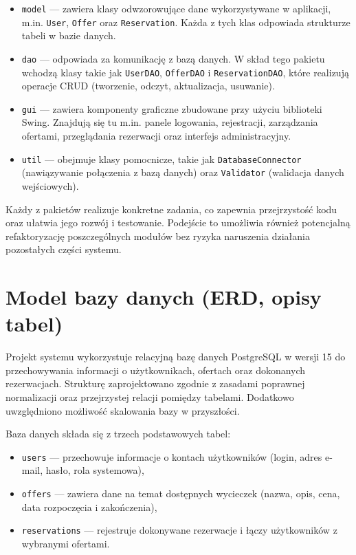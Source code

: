 \begin{itemize}
    \item \texttt{model} — zawiera klasy odwzorowujące dane wykorzystywane w aplikacji, m.in. \texttt{User}, \texttt{Offer} oraz \texttt{Reservation}. Każda z tych klas odpowiada strukturze tabeli w bazie danych.
    
    \item \texttt{dao} — odpowiada za komunikację z bazą danych. W skład tego pakietu wchodzą klasy takie jak \texttt{UserDAO}, \texttt{OfferDAO} i \texttt{ReservationDAO}, które realizują operacje CRUD (tworzenie, odczyt, aktualizacja, usuwanie).
    
    \item \texttt{gui} — zawiera komponenty graficzne zbudowane przy użyciu biblioteki Swing. Znajdują się tu m.in. panele logowania, rejestracji, zarządzania ofertami, przeglądania rezerwacji oraz interfejs administracyjny.
    
    \item \texttt{util} — obejmuje klasy pomocnicze, takie jak \texttt{DatabaseConnector} (nawiązywanie połączenia z bazą danych) oraz \texttt{Validator} (walidacja danych wejściowych).
\end{itemize}

Każdy z pakietów realizuje konkretne zadania, co zapewnia przejrzystość kodu oraz ułatwia jego rozwój i testowanie. Podejście to umożliwia również potencjalną refaktoryzację poszczególnych modułów bez ryzyka naruszenia działania pozostałych części systemu.


\section{Model bazy danych (ERD, opisy tabel)}
\label{sec:Model bazy danych (ERD, opisy tabel)}

Projekt systemu wykorzystuje relacyjną bazę danych PostgreSQL w wersji 15 do przechowywania informacji o użytkownikach, ofertach oraz dokonanych rezerwacjach. Strukturę zaprojektowano zgodnie z zasadami poprawnej normalizacji oraz przejrzystej relacji pomiędzy tabelami. Dodatkowo uwzględniono możliwość skalowania bazy w przyszłości.

Baza danych składa się z trzech podstawowych tabel:

\begin{itemize}
    \item \texttt{users} — przechowuje informacje o kontach użytkowników (login, adres e-mail, hasło, rola systemowa),
    \item \texttt{offers} — zawiera dane na temat dostępnych wycieczek (nazwa, opis, cena, data rozpoczęcia i zakończenia),
    \item \texttt{reservations} — rejestruje dokonywane rezerwacje i łączy użytkowników z wybranymi ofertami.
\end{itemize}

